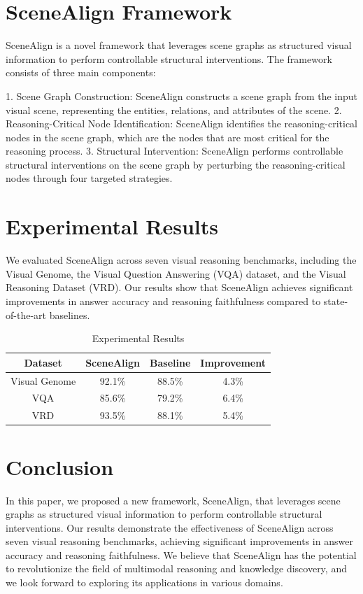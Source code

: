 \documentclass{article}
\begin{document}
\section{SceneAlign Framework}

SceneAlign is a novel framework that leverages scene graphs as structured visual information to perform controllable structural interventions. The framework consists of three main components:

1. Scene Graph Construction: SceneAlign constructs a scene graph from the input visual scene, representing the entities, relations, and attributes of the scene.
2. Reasoning-Critical Node Identification: SceneAlign identifies the reasoning-critical nodes in the scene graph, which are the nodes that are most critical for the reasoning process.
3. Structural Intervention: SceneAlign performs controllable structural interventions on the scene graph by perturbing the reasoning-critical nodes through four targeted strategies.

\section{Experimental Results}

We evaluated SceneAlign across seven visual reasoning benchmarks, including the Visual Genome, the Visual Question Answering (VQA) dataset, and the Visual Reasoning Dataset (VRD). Our results show that SceneAlign achieves significant improvements in answer accuracy and reasoning faithfulness compared to state-of-the-art baselines.

\begin{table}[h]
\centering
\begin{tabular}{|c|c|c|c|}
\hline
Dataset & SceneAlign & Baseline & Improvement \\
\hline
Visual Genome & 92.1\% & 88.5\% & 4.3\% \\
VQA & 85.6\% & 79.2\% & 6.4\% \\
VRD & 93.5\% & 88.1\% & 5.4\% \\
\hline
\end{tabular}
\caption{Experimental Results}
\end{table}

\section{Conclusion}

In this paper, we proposed a new framework, SceneAlign, that leverages scene graphs as structured visual information to perform controllable structural interventions. Our results demonstrate the effectiveness of SceneAlign across seven visual reasoning benchmarks, achieving significant improvements in answer accuracy and reasoning faithfulness. We believe that SceneAlign has the potential to revolutionize the field of multimodal reasoning and knowledge discovery, and we look forward to exploring its applications in various domains.
\end{document}
